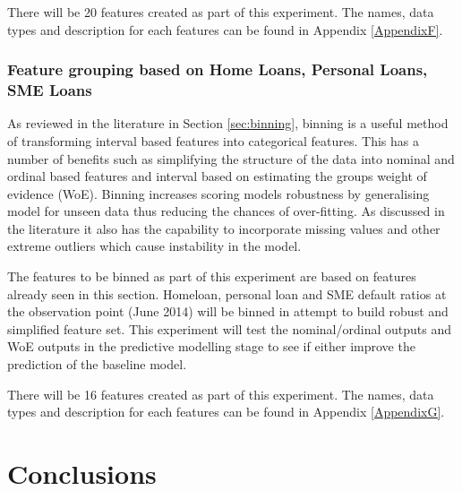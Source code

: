 There will be 20 features created as part of this experiment. The names, data types and description for each features can be found in Appendix \ref{AppendixF}.

\subsubsection{Feature grouping based on Home Loans, Personal Loans, SME Loans}
As reviewed in the literature in Section \ref{sec:binning}, binning is a useful method of transforming interval based features into categorical features. This has a number of benefits such as simplifying the structure of the data into nominal and ordinal based features and interval based on estimating the groups weight of evidence (WoE). Binning increases scoring models robustness by generalising model for unseen data thus reducing the chances of over-fitting. As discussed in the literature it also has the capability to incorporate missing values and other extreme outliers which cause instability in the model. 

The features to be binned as part of this experiment are based on features already seen in this section. Homeloan, personal loan and SME default ratios at the observation point (June 2014) will be binned in attempt to build robust and simplified feature set. This experiment will test the nominal/ordinal outputs and WoE outputs in the predictive modelling stage to see if either improve the prediction of the baseline model.

There will be 16 features created as part of this experiment. The names, data types and description for each features can be found in Appendix \ref{AppendixG}.


\section{Conclusions}\label{desConc}


\begin{comment}
This chapter has discussed the processes required to carry out data mining techniques on non-relational web log data. The required data transformations have been discussed as well as the implemented methods for feature generation.
\end{comment}